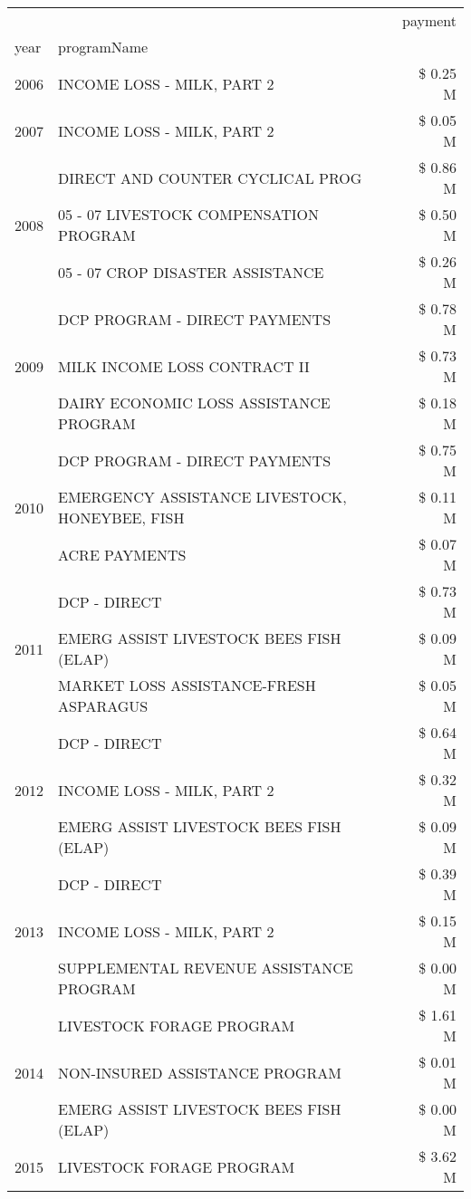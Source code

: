 \begin{tabular}{llr}
\toprule
 &  & payment \\
year & programName &  \\
\midrule
2006 & INCOME LOSS - MILK, PART 2 & \$ 0.25 M \\
\cline{1-3}
2007 & INCOME LOSS - MILK, PART 2 & \$ 0.05 M \\
\cline{1-3}
\multirow[t]{3}{*}{2008} & DIRECT AND COUNTER CYCLICAL PROG & \$ 0.86 M \\
 & 05 - 07 LIVESTOCK COMPENSATION PROGRAM & \$ 0.50 M \\
 & 05 - 07 CROP DISASTER ASSISTANCE & \$ 0.26 M \\
\cline{1-3}
\multirow[t]{3}{*}{2009} & DCP PROGRAM - DIRECT PAYMENTS & \$ 0.78 M \\
 & MILK INCOME LOSS CONTRACT II & \$ 0.73 M \\
 & DAIRY ECONOMIC LOSS ASSISTANCE PROGRAM & \$ 0.18 M \\
\cline{1-3}
\multirow[t]{3}{*}{2010} & DCP PROGRAM - DIRECT PAYMENTS & \$ 0.75 M \\
 & EMERGENCY ASSISTANCE LIVESTOCK, HONEYBEE, FISH & \$ 0.11 M \\
 & ACRE PAYMENTS & \$ 0.07 M \\
\cline{1-3}
\multirow[t]{3}{*}{2011} & DCP - DIRECT & \$ 0.73 M \\
 & EMERG ASSIST LIVESTOCK BEES FISH (ELAP) & \$ 0.09 M \\
 & MARKET LOSS ASSISTANCE-FRESH ASPARAGUS & \$ 0.05 M \\
\cline{1-3}
\multirow[t]{3}{*}{2012} & DCP - DIRECT & \$ 0.64 M \\
 & INCOME LOSS - MILK, PART 2 & \$ 0.32 M \\
 & EMERG ASSIST LIVESTOCK BEES FISH (ELAP) & \$ 0.09 M \\
\cline{1-3}
\multirow[t]{3}{*}{2013} & DCP - DIRECT & \$ 0.39 M \\
 & INCOME LOSS - MILK, PART 2 & \$ 0.15 M \\
 & SUPPLEMENTAL REVENUE ASSISTANCE PROGRAM & \$ 0.00 M \\
\cline{1-3}
\multirow[t]{3}{*}{2014} & LIVESTOCK FORAGE PROGRAM & \$ 1.61 M \\
 & NON-INSURED ASSISTANCE PROGRAM & \$ 0.01 M \\
 & EMERG ASSIST LIVESTOCK BEES FISH (ELAP) & \$ 0.00 M \\
\cline{1-3}
\multirow[t]{3}{*}{2015} & LIVESTOCK FORAGE PROGRAM & \$ 3.62 M \\

\end{tabular}
